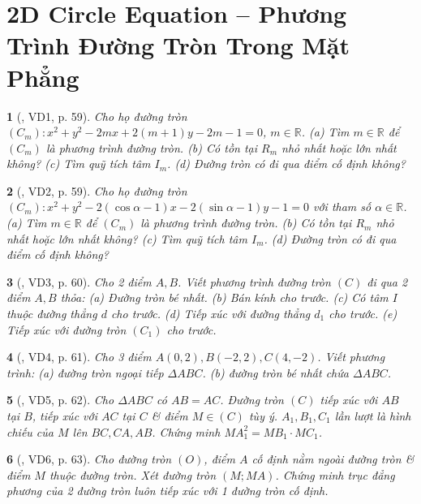 \documentclass{article}
\newtheorem{baitoan}{}
\begin{document}
\section{2D Circle Equation -- Phương Trình Đường Tròn Trong Mặt Phẳng}

\begin{baitoan}[\cite{Hai_Hung_Thu_Tung_ncpt_Toan_10_tap_2}, VD1, p. 59]
	Cho họ đường tròn $(C_m):x^2 + y^2 - 2mx + 2(m + 1)y - 2m - 1 = 0$, $m\in\mathbb{R}$. (a) Tìm $m\in\mathbb{R}$ để $(C_m)$ là phương trình đường tròn. (b) Có tồn tại $R_m$ nhỏ nhất hoặc lớn nhất không? (c) Tìm quỹ tích tâm $I_m$. (d) Đường tròn có đi qua điểm cố định không?
\end{baitoan}

\begin{baitoan}[\cite{Hai_Hung_Thu_Tung_ncpt_Toan_10_tap_2}, VD2, p. 59]
	Cho họ đường tròn $(C_m):x^2 + y^2 - 2(\cos\alpha - 1)x - 2(\sin\alpha - 1)y - 1 = 0$ với tham số $\alpha\in\mathbb{R}$. (a) Tìm $m\in\mathbb{R}$ để $(C_m)$ là phương trình đường tròn. (b) Có tồn tại $R_m$ nhỏ nhất hoặc lớn nhất không? (c) Tìm quỹ tích tâm $I_m$. (d) Đường tròn có đi qua điểm cố định không?
\end{baitoan}

\begin{baitoan}[\cite{Hai_Hung_Thu_Tung_ncpt_Toan_10_tap_2}, VD3, p. 60]
	Cho 2 điểm $A,B$. Viết phương trình đường tròn $(C)$ đi qua 2 điểm $A,B$ thỏa: (a) Đường tròn bé nhất. (b) Bán kính cho trước. (c) Có tâm $I$ thuộc đường thẳng $d$ cho trước. (d) Tiếp xúc với đường thẳng $d_1$ cho trước. (e) Tiếp xúc với đường tròn $(C_1)$ cho trước.
\end{baitoan}

\begin{baitoan}[\cite{Hai_Hung_Thu_Tung_ncpt_Toan_10_tap_2}, VD4, p. 61]
	Cho 3 điểm $A(0,2),B(-2,2),C(4,-2)$. Viết phương trình: (a) đường tròn ngoại tiếp $\Delta ABC$. (b) đường tròn bé nhất chứa $\Delta ABC$.
\end{baitoan}

\begin{baitoan}[\cite{Hai_Hung_Thu_Tung_ncpt_Toan_10_tap_2}, VD5, p. 62]
	Cho $\Delta ABC$ có $AB = AC$. Đường tròn $(C)$ tiếp xúc với $AB$ tại $B$, tiếp xúc với $AC$ tại $C$ \& điểm $M\in(C)$ tùy ý. $A_1,B_1,C_1$ lần lượt là hình chiếu của $M$ lên $BC,CA,AB$. Chứng minh $MA_1^2 = MB_1\cdot MC_1$.
\end{baitoan}

\begin{baitoan}[\cite{Hai_Hung_Thu_Tung_ncpt_Toan_10_tap_2}, VD6, p. 63]
	Cho đường tròn $(O)$, điểm $A$ cố định nằm ngoài đường tròn \& điểm $M$ thuộc đường tròn. Xét đường tròn $(M;MA)$. Chứng minh trục đẳng phương của 2 đường tròn luôn tiếp xúc với 1 đường tròn cố định.
\end{baitoan}
\end{document}
